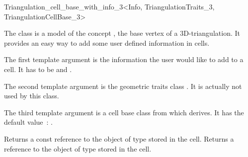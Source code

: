 

\begin{ccRefClass}{Triangulation_cell_base_with_info_3<Info, TriangulationTraits_3, TriangulationCellBase_3>}

\ccDefinition

The class  is a model of the concept
, the base vertex of a 3D-triangulation.
It provides an easy way to add some user defined information in cells.


\ccParameters

The first template argument is the information the user would like to add
to a cell.  It has to be  and .

The second template argument is the geometric traits class
.  It is actually not used by this class.

The third template argument is a cell base class from which
 derives.  It has the default value~:
.

\ccIsModel {}

\ccInheritsFrom {}

\ccTypes
{}


\ccAccessFunctions
{}
\ccTagFullDeclarations

{Returns a const reference to the object of type  stored in the cell.}
\ccGlue
{}
{Returns a reference to the object of type  stored in the cell.}

\ccSeeAlso

\\

\end{ccRefClass}
